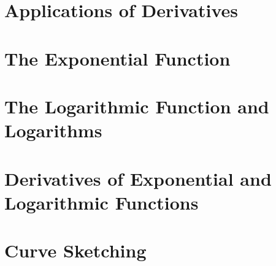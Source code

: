 \documentclass{article}
\begin{document}
\section{Applications of Derivatives}
\blindtext
\section{The Exponential Function}
\blindtext
\section{The Logarithmic Function and Logarithms}
\blindtext
\section{Derivatives of Exponential and Logarithmic Functions}
\blindtext
\section{Curve Sketching}
\blindtext
\end{document}
